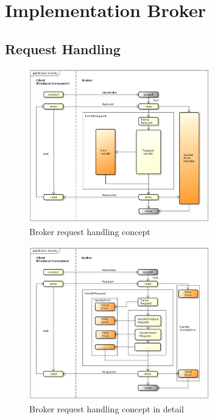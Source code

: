 \chapter{Implementation Broker}

\section{Request Handling}



\begin{figure}[H]
    \centering
    \includegraphics[width=0.7\textwidth]{images/broker-activity.png}
    \caption{Broker request handling concept}
    \label{fig:broker-activity.png}
\end{figure}

\begin{figure}[H]
    \centering
    \includegraphics[width=0.7\textwidth]{images/broker-activity-detail.png}
    \caption{Broker request handling concept in detail}
    \label{fig:broker-activity-detail.png}
\end{figure}


